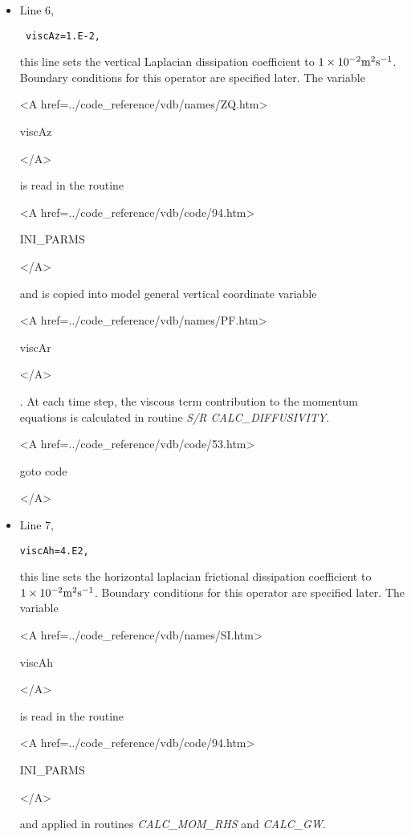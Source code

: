 \begin{itemize}
\item Line 6, 
\begin{verbatim} viscAz=1.E-2, \end{verbatim} 
this line sets the vertical Laplacian dissipation coefficient to
$1 \times 10^{-2} {\rm m^{2}s^{-1}}$. Boundary conditions
for this operator are specified later. 
The variable 
{\bf 
\begin{rawhtml} <A href=../code_reference/vdb/names/ZQ.htm> \end{rawhtml}
viscAz
\begin{rawhtml} </A>\end{rawhtml}
}
is read in the routine
{\it
\begin{rawhtml} <A href=../code_reference/vdb/code/94.htm> \end{rawhtml}
INI\_PARMS
\begin{rawhtml} </A>\end{rawhtml}
}
and is copied into model general vertical coordinate variable 
{\bf 
\begin{rawhtml} <A href=../code_reference/vdb/names/PF.htm> \end{rawhtml}
viscAr
\begin{rawhtml} </A>\end{rawhtml}
}. At each time step, the viscous term contribution to the momentum equations
is calculated in routine
{\it S/R CALC\_DIFFUSIVITY}.

{\bf
\begin{rawhtml} <A href=../code_reference/vdb/code/53.htm> \end{rawhtml}
goto code
\begin{rawhtml} </A>\end{rawhtml}
}

\item Line 7, 
\begin{verbatim}
viscAh=4.E2,
\end{verbatim} 
this line sets the horizontal laplacian frictional dissipation coefficient to
$1 \times 10^{-2} {\rm m^{2}s^{-1}}$. Boundary conditions
for this operator are specified later.
The variable 
{\bf 
\begin{rawhtml} <A href=../code_reference/vdb/names/SI.htm> \end{rawhtml}
viscAh
\begin{rawhtml} </A>\end{rawhtml}
}
is read in the routine
{\it
\begin{rawhtml} <A href=../code_reference/vdb/code/94.htm> \end{rawhtml}
INI\_PARMS
\begin{rawhtml} </A>\end{rawhtml}
} and applied in routines {\it CALC\_MOM\_RHS} and {\it CALC\_GW}.


\end{itemize}
